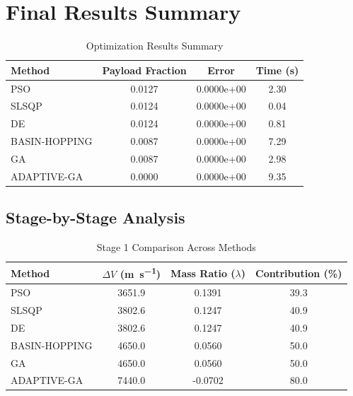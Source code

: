 \documentclass{article}
\begin{document}
\section{Final Results Summary}
\begin{table}[H]
\centering
\caption{Optimization Results Summary}
\begin{tabular}{lS[table-format=1.4]S[table-format=1.4e-1]S[table-format=1.2]}
\toprule
Method & {Payload Fraction} & {Error} & {Time (\si{\second})} \\
\midrule
PSO          & 0.0127 & 0.0000e+00 & 2.30 \\
SLSQP        & 0.0124 & 0.0000e+00 & 0.04 \\
DE           & 0.0124 & 0.0000e+00 & 0.81 \\
BASIN-HOPPING & 0.0087 & 0.0000e+00 & 7.29 \\
GA           & 0.0087 & 0.0000e+00 & 2.98 \\
ADAPTIVE-GA  & 0.0000 & 0.0000e+00 & 9.35 \\
\bottomrule
\end{tabular}
\end{table}

\subsection{Stage-by-Stage Analysis}


\begin{table}[H]
\centering
\caption{Stage 1 Comparison Across Methods}
\begin{tabular}{lS[table-format=4.1]S[table-format=1.4]S[table-format=3.1]}
\toprule
Method & {$\Delta V$ (\si{\meter\per\second})} & {Mass Ratio ($\lambda$)} & {Contribution (\%)} \\
\midrule
PSO          & 3651.9 & 0.1391 & 39.3 \\
SLSQP        & 3802.6 & 0.1247 & 40.9 \\
DE           & 3802.6 & 0.1247 & 40.9 \\
BASIN-HOPPING & 4650.0 & 0.0560 & 50.0 \\
GA           & 4650.0 & 0.0560 & 50.0 \\
ADAPTIVE-GA  & 7440.0 & -0.0702 & 80.0 \\
\bottomrule
\end{tabular}
\end{table}
\end{document}
